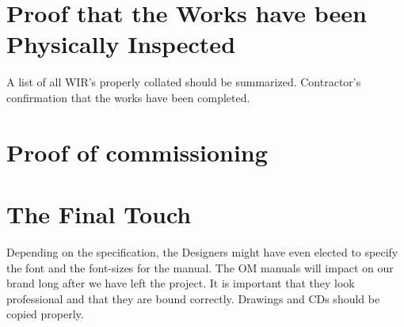 \section*{Proof that the Works have been Physically Inspected}

A list of all WIR's properly collated should be summarized.
Contractor's confirmation that the works have been completed.

\section*{Proof of commissioning}


\section*{The Final Touch}

Depending on the specification, the Designers might have even elected to
specify the font and the font-sizes for the manual. The OM manuals will
impact on our brand long after we have left the project. It is important that
they look professional and that they are bound correctly. Drawings and CDs
should be copied properly.










